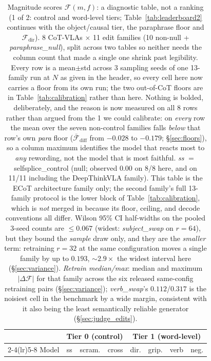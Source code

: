 \begin{table}[t]
\centering\scriptsize
\caption{Magnitude scores $\mathcal{F}(m, f)$: a diagnostic table, not a ranking (1 of 2: control and word-level tiers; Table~\ref{tab:leaderboard2} continues with the object/causal tier, the paraphrase floor and $\mathcal{F}_{\text{dir}}$). 8 CoT-VLAs $\times$ 11 edit families (10 non-null + \emph{paraphrase\_null}), split across two tables so neither needs the column count that made a single one shrink past legibility. Every row is a mean$\pm$std across 3 sampling seeds of one 13-family run at $N$ as given in the header, so every cell here now carries a floor from its own run; the two out-of-CoT floors are in Table~\ref{tab:calibration} rather than here. Nothing is bolded, deliberately, and the reason is now measured on all 8 rows rather than argued from the 1 we could calibrate: on \emph{every} row the mean over the seven non-control families falls \emph{below} that row's own \emph{para} floor ($\bar{\mathcal{F}}_{\text{diff}}$ from $-0.028$ to $-0.179$; \S\ref{sec:floors}), so a column maximum identifies the model that reacts most to \emph{any} rewording, not the model that is most faithful. \emph{ss} $=$ selfsplice\_control (null; observed $0.00$ on 8/8 here, and on 11/11 including the DeepThinkVLA family). This table is the ECoT architecture family only; the second family's full 13-family protocol is the lower block of Table~\ref{tab:calibration}, which is \emph{not} merged in because its floor, ceiling, and decode conventions all differ. Wilson 95\% CI half-widths on the pooled 3-seed counts are $\leq 0.067$ (widest: \emph{subject\_swap} on $r{=}64$), but they bound the \emph{sample} draw only, and they are the \emph{smaller} term: retraining $r{=}32$ at the same configuration moves a single family by up to $0.193$, ${\sim}2.9\times$ the widest interval here (\S\ref{sec:variance}). \emph{Retrain median/max}: median and maximum $|\Delta \mathcal{F}|$ for that family across the six released same-config retraining pairs (\S\ref{sec:variance}); \emph{verb\_swap}'s $0.112$/$0.317$ is the noisiest cell in the benchmark by a wide margin, consistent with it also being the least semantically reliable generator (\S\ref{sec:judge_edits}).}
\label{tab:leaderboard}
\begin{tabular}{l r r r r r r r}
\toprule
& \multicolumn{3}{c}{Tier 0 (control)} & \multicolumn{4}{c}{Tier 1 (word-level)} \\
\cmidrule(lr){2-4}\cmidrule(lr){5-8}
Model & ss & scram. & cross & dir. & grip. & verb & neg. \\

\end{tabular}
\end{table}
